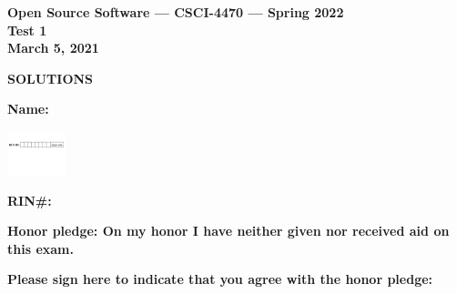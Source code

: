 \documentclass[10pt]{article}
\begin{document}
\thispagestyle{empty}

\vspace*{0.5in}

\begin{center}
\Large
\textbf{Open Source Software --- CSCI-4470 --- Spring 2022} \\
\textbf{Test 1} \\
\textbf{March 5, 2021}
\end{center}


\beginanswers
\begin{center}
\Large
\textbf{SOLUTIONS}
\end{center}

\else


\begin{center}

\textbf{\Large Name:} \underline {\hspace{2.0in}} \\

\bigskip
\bigskip

\centerline{
\includegraphics[height=0.5in]{boxes}
}


\bigskip

\textbf{\Large RIN\#:} \underline {\hspace{1.5in}}  

\vspace*{0.4in}
{\large\bf Honor pledge: On my honor I have neither given
nor received aid on this exam.}

\vspace*{0.1in}
{\large\bf Please sign here to indicate that you agree with the honor pledge: \underline {\hspace{1.5in}}}
\end{center}
\end{document}

